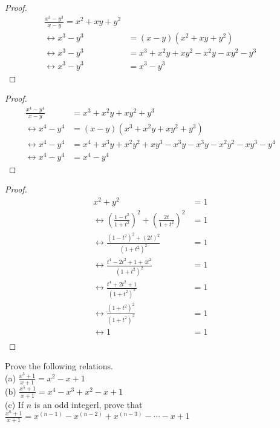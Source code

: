 \documentclass[6pt]{article}
\begin{document}
\begin{proof}
\begin{align*}
\frac{x^3 - y^3}{x - y} = x^2 + xy + y^2 && \\
\leftrightarrow x^3 - y^3 &= (x - y)(x^2 + xy + y^2) && \\
\leftrightarrow x^3 - y^3 &= x^3 + x^2y + xy^2 - x^2y - xy^2 - y^3 && \\
\leftrightarrow x^3 - y^3 &= x^3 - y^3
\end{align*}
\end{proof}
\begin{proof}
\begin{align*}
\frac{x^4 - y^4}{x - y} &= x^3 + x^2y + xy^2 + y^3 && \\
\leftrightarrow x^4 - y^4 &= (x - y)(x^3 + x^2y + xy^2 + y^3) && \\
\leftrightarrow x^4 - y^4 &= x^4 + x^3y + x^2y^2 + xy^3 - x^3y - x^3y - x^2y^2 - xy^3 - y^4 && \\
\leftrightarrow x^4 - y^4 &= x^4 - y^4
\end{align*}
\end{proof}
\begin{proof}
\begin{align*}
x^2 + y^2 &= 1 && \\
\leftrightarrow {\left(\frac{1 - t^2}{1 + t^2}\right)}^2 
    + {\left(\frac{2t}{1 + t^2}\right)}^2 &= 1 && \\
    \leftrightarrow \frac{{(1 - t^2)}^2 + {(2t)}^2}{{(1 + t^2)}^2} &= 1 && \\
    \leftrightarrow \frac{t^4 - 2t^2 + 1 + 4t^2}{{(1 + t^2)}^2} &= 1 && \\
    \leftrightarrow \frac{t^4 + 2t^2 + 1}{{(1 + t^2)}^2} &= 1 && \\
    \leftrightarrow \frac{{(1 + t^2)}^2}{{(1 + t^2)}^2} &= 1 && \\
    \leftrightarrow 1 &= 1 && \\
\end{align*}
\end{proof}


\begin{tcolorbox}[title=Problem 5, breakable]
Prove the following relations. \\
(a) $\frac{x^3 + 1}{x + 1} = x^2 - x + 1$ \\
(b) $\frac{x^5 + 1}{x + 1} = x^4 - x^3 + x^2 - x + 1$ \\
(c) If $n$ is an odd integerl, prove that \\
$\frac{x^n + 1}{x + 1} = x^{(n - 1)} - x^{(n - 2)} + x^{(n - 3)} - \cdots -x + 1$
\end{tcolorbox}
\end{document}
